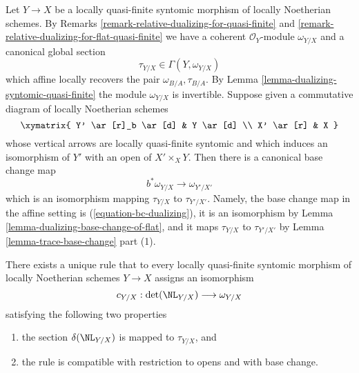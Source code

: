 \noindent
Let $Y \to X$ be a locally quasi-finite syntomic morphism of
locally Noetherian schemes. By
Remarks \ref{remark-relative-dualizing-for-quasi-finite} and
\ref{remark-relative-dualizing-for-flat-quasi-finite} we have
a coherent $\mathcal{O}_Y$-module $\omega_{Y/X}$ and a canonical
global section
$$
\tau_{Y/X} \in \Gamma(Y, \omega_{Y/X})
$$
which affine locally recovers the pair $\omega_{B/A}, \tau_{B/A}$.
By Lemma \ref{lemma-dualizing-syntomic-quasi-finite} the module
$\omega_{Y/X}$ is invertible. Suppose given a commutative diagram of
locally Noetherian schemes
$$
\xymatrix{
Y' \ar[r]_b \ar[d] & Y \ar[d] \\
X' \ar[r] & X
}
$$
whose vertical arrows are locally quasi-finite syntomic and which
induces an isomorphism of $Y'$ with an open of $X' \times_X Y$.
Then there is a canonical base change map
$$
b^*\omega_{Y/X} \longrightarrow \omega_{Y'/X'}
$$
which is an isomorphism
mapping $\tau_{Y/X}$ to $\tau_{Y'/X'}$. Namely, the base change map
in the affine setting is (\ref{equation-bc-dualizing}), it is an
isomorphism by Lemma \ref{lemma-dualizing-base-change-of-flat}, and it
maps $\tau_{Y/X}$ to $\tau_{Y'/X'}$ by
Lemma \ref{lemma-trace-base-change} part (1).

\begin{proposition}
\label{proposition-tate-map}
There exists a unique rule that to every locally quasi-finite syntomic
morphism of locally Noetherian schemes $Y \to X$ assigns an isomorphism
$$
c_{Y/X} : \det(\NL_{Y/X}) \longrightarrow \omega_{Y/X}
$$
satisfying the following two properties
\begin{enumerate}
\item the section $\delta(\NL_{Y/X})$ is mapped to $\tau_{Y/X}$, and
\item the rule is compatible with restriction to opens and with
base change.
\end{enumerate}
\end{proposition}


